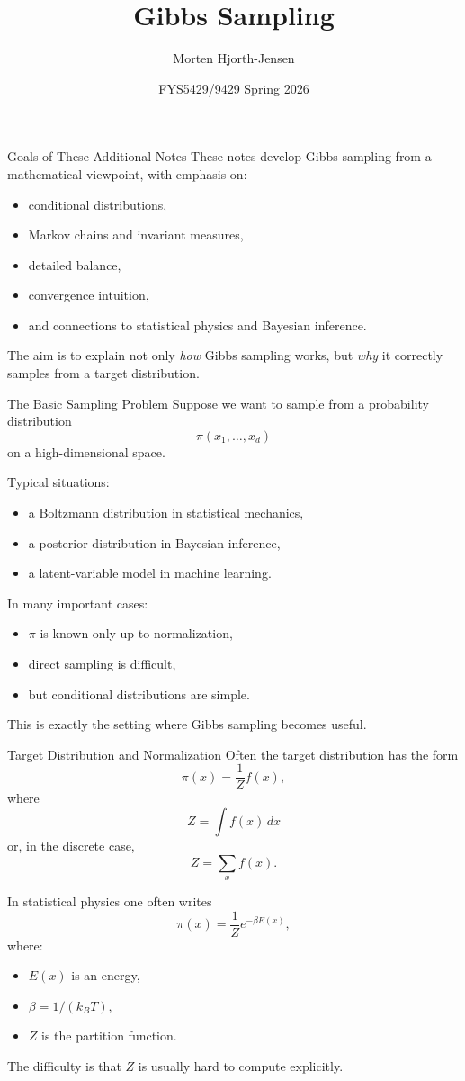 \documentclass[aspectratio=169]{beamer}
\title{Gibbs Sampling}
\author{Morten Hjorth-Jensen}
\date{FYS5429/9429 Spring 2026}
\begin{document}
\frame{\titlepage}

\begin{frame}{Goals of These Additional Notes}
These notes develop Gibbs sampling from a mathematical viewpoint, with emphasis on:
\begin{itemize}
    \item conditional distributions,
    \item Markov chains and invariant measures,
    \item detailed balance,
    \item convergence intuition,
    \item and connections to statistical physics and Bayesian inference.
\end{itemize}

\medskip

The aim is to explain not only \emph{how} Gibbs sampling works, but \emph{why} it correctly samples from a target distribution.
\end{frame}

\begin{frame}{The Basic Sampling Problem}
Suppose we want to sample from a probability distribution
\[
\pi(x_1,\dots,x_d)
\]
on a high-dimensional space.

\medskip

Typical situations:
\begin{itemize}
    \item a Boltzmann distribution in statistical mechanics,
    \item a posterior distribution in Bayesian inference,
    \item a latent-variable model in machine learning.
\end{itemize}

In many important cases:
\begin{itemize}
    \item \(\pi\) is known only up to normalization,
    \item direct sampling is difficult,
    \item but conditional distributions are simple.
\end{itemize}

This is exactly the setting where Gibbs sampling becomes useful.
\end{frame}

\begin{frame}{Target Distribution and Normalization}
Often the target distribution has the form
\[
\pi(x)=\frac{1}{Z} f(x),
\]
where
\[
Z=\int f(x)\,dx
\]
or, in the discrete case,
\[
Z=\sum_x f(x).
\]

In statistical physics one often writes
\[
\pi(x)=\frac{1}{Z}e^{-\beta E(x)},
\]
where:
\begin{itemize}
    \item \(E(x)\) is an energy,
    \item \(\beta = 1/(k_B T)\),
    \item \(Z\) is the partition function.
\end{itemize}

The difficulty is that \(Z\) is usually hard to compute explicitly.
\end{frame}
\end{document}

